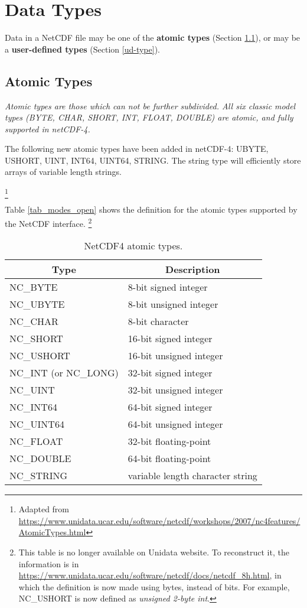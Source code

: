 \section{Data Types}

Data in a NetCDF file may be one of the \textbf{atomic types} (Section \ref{ed-type}), or may be a \textbf{user-defined types} (Section \ref{ud-type}).

\subsection{Atomic Types}
\label{ed-type}

{\itshape
Atomic types are those which can not be further subdivided.
All six classic model types (BYTE, CHAR, SHORT, INT, FLOAT, DOUBLE) are atomic, and fully supported in netCDF-4.

The following new atomic types have been added in netCDF-4: UBYTE, USHORT, UINT, INT64, UINT64, STRING.
The string type will efficiently store arrays of variable length strings.
}\footnote{Adapted from \url{https://www.unidata.ucar.edu/software/netcdf/workshops/2007/nc4features/AtomicTypes.html}}

Table \ref{tab_modes_open} shows the definition for the atomic types supported by the NetCDF interface.
\footnote{This table is no longer available on Unidata website. To reconstruct it, the information is in \url{https://www.unidata.ucar.edu/software/netcdf/docs/netcdf_8h.html}, in which the definition is now made using bytes, instead of bits. For example, NC\_USHORT is now defined as \textit{unsigned 2-byte int}.}

\begin{table}[H]
\centering
\begin{tabular}{|l|l|}
\hline
\multicolumn{1}{|c|}{Type} & \multicolumn{1}{c|}{Description} \\ \hline \hline
NC\_BYTE & 8-bit signed integer \\ \hline
NC\_UBYTE & 8-bit unsigned integer \\ \hline
NC\_CHAR & 8-bit character \\ \hline
NC\_SHORT & 16-bit signed integer \\ \hline
NC\_USHORT & 16-bit unsigned integer \\ \hline
NC\_INT (or NC\_LONG) & 32-bit signed integer \\ \hline
NC\_UINT & 32-bit unsigned integer \\ \hline
NC\_INT64 & 64-bit signed integer \\ \hline
NC\_UINT64 & 64-bit unsigned integer \\ \hline
NC\_FLOAT & 32-bit floating-point \\ \hline
NC\_DOUBLE & 64-bit floating-point \\ \hline
NC\_STRING & variable length character string \\ \hline
\hline
\end{tabular}
\caption{NetCDF4 atomic types.}
\end{table}

